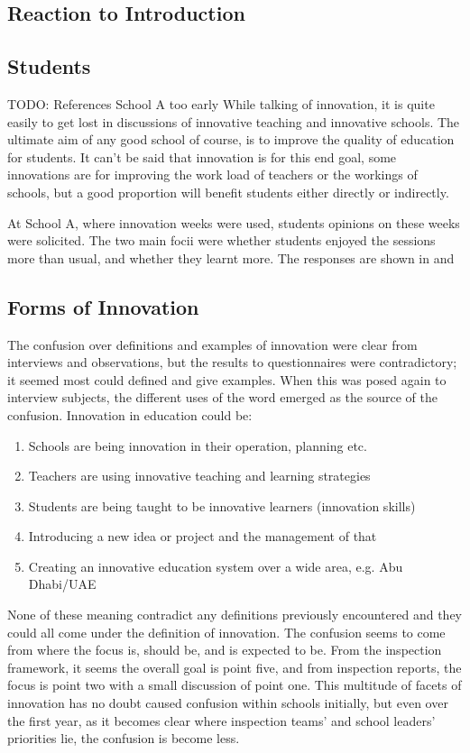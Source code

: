 \subsection{Reaction to Introduction}

\subsection{Students}
TODO: References School A too early
While talking of innovation, it is quite easily to get lost in discussions of innovative teaching and innovative schools. The ultimate aim of any good school of course, is to improve the quality of education for students. It can't be said that innovation is for this end goal, some innovations are for improving the work load of teachers or the workings of schools, but a good proportion will benefit students either directly or indirectly.

At School A, where innovation weeks were used, students opinions on these weeks were solicited. The two main focii were whether students enjoyed the sessions more than usual, and whether they learnt more. The responses are shown in \cite{enjoy} and \cite{learn}

\subsection{Forms of Innovation}

The confusion over definitions and examples of innovation were clear from interviews and observations, but the results to questionnaires were contradictory; it seemed most could defined and give examples.
When this was posed again to interview subjects, the different uses of the word emerged as the source of the confusion.
Innovation in education could be:
\begin{enumerate}
\item Schools are being innovation in their operation, planning etc.
\item Teachers are using innovative teaching and learning strategies 
\item Students are being taught to be innovative learners (innovation skills)
\item Introducing a new idea or project and the management of that
\item Creating an innovative education system over a wide area, e.g. Abu Dhabi/UAE
\end{enumerate}
None of these meaning contradict any definitions previously encountered and they could all come under the definition of innovation. The confusion seems to come from where the focus is, should be, and is expected to be. 
From the inspection framework, it seems the overall goal is point five, and from inspection reports, the focus is point two with a small discussion of point one.
This multitude of facets of innovation has no doubt caused confusion within schools initially, but even over the first year, as it becomes clear where inspection teams’ and school leaders’ priorities lie, the confusion is become less.


